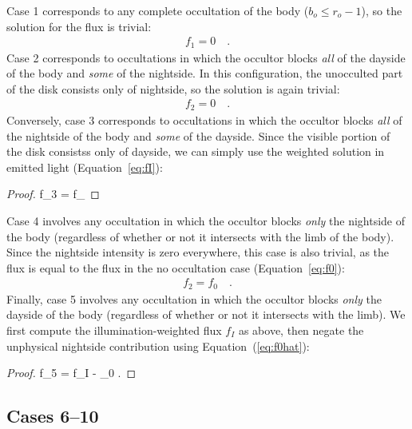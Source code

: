 \documentclass[modern]{aastex62}
\begin{document}
Case 1 corresponds to any complete occultation of the body
($b_o \le r_o - 1$), so the solution for the flux is trivial:
%
\begin{align}
    \label{eq:f1}
    f_1 = 0
    \quad.
\end{align}
%
Case 2 corresponds to occultations in which the occultor blocks \emph{all} of
the dayside of the body and \emph{some} of the nightside. In this
configuration, the unocculted part of the disk consists only of nightside, so
the solution is again trivial:
%
\begin{align}{}
    \label{eq:f2}
    f_2 = 0
    \quad.
\end{align}
%
Conversely, case 3 corresponds to occultations in which the occultor blocks
\emph{all} of the nightside of the body and \emph{some} of the dayside.
Since the visible portion of the disk consistss only of dayside, we can
simply use the weighted solution in emitted light
(Equation~\ref{eq:fI}):
%
\begin{proof}{}
    \label{eq:f3}
    f_3 = f_
\end{proof}
%
Case 4 involves any occultation in which the occultor blocks \emph{only} the
nightside of the body (regardless of whether or not it intersects with the
limb of the body). Since the nightside intensity is zero everywhere, this case
is also trivial, as the flux is equal to the flux in the no occultation case
(Equation~\ref{eq:f0}):
%
\begin{align}
    \label{eq:f4}
    f_2 = f_0
    \quad.
\end{align}
%
Finally, case 5 involves any occultation in which the occultor blocks
\emph{only} the dayside of the body (regardless of whether or not it
intersects with the limb). We first compute the illumination-weighted flux
$f_I$ as above, then negate the unphysical nightside contribution
using Equation~(\ref{eq:f0hat}):
%
\begin{proof}{}
    \label{eq:f5}
    f_5 = f_I - _0
    \quad.
\end{proof}

%

\subsection{Cases 6--10}
\label{sec:cases-hard}
%
\end{document}
